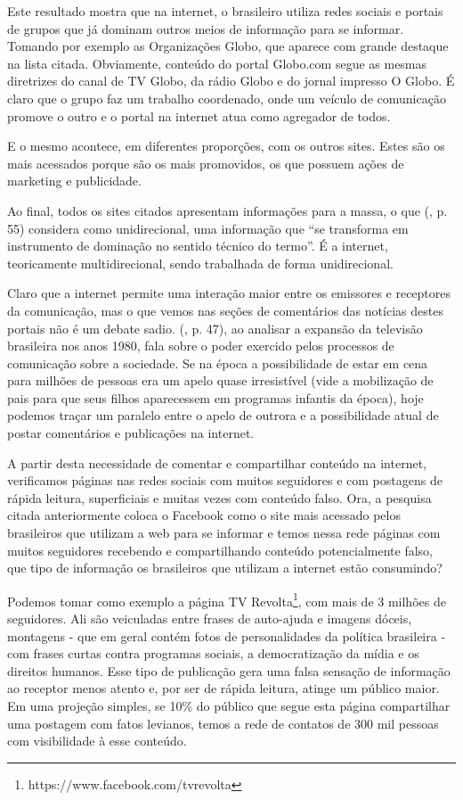 \documentclass[
	article,			%
	12pt,				%
	oneside,			%
	a4paper,			%
	english,			%
	brazil,				%
	]{abntex2}
\begin{document}
Este resultado mostra que na internet, o brasileiro utiliza redes sociais e portais de grupos que já dominam outros meios de informação para se informar. Tomando por exemplo as Organizações Globo, que aparece com grande destaque na lista citada. Obviamente, conteúdo do portal Globo.com segue as mesmas diretrizes do canal de TV Globo, da rádio Globo e do jornal impresso O Globo. É claro que o grupo faz um trabalho coordenado, onde um veículo de comunicação promove o outro e o portal na internet atua como agregador de todos.

E o mesmo acontece, em diferentes proporções, com os outros sites. Estes são os mais acessados porque são os mais promovidos, os que possuem ações de marketing e publicidade. 

Ao final, todos os sites citados apresentam informações para a massa, o que  (\citeyear{bolano2000}, p. 55) considera como unidirecional, uma informação que “se transforma em instrumento de dominação no sentido técnico do termo”. É a internet, teoricamente multidirecional, sendo trabalhada de forma unidirecional.

Claro que a internet permite uma interação maior entre os emissores e receptores da comunicação, mas o que vemos nas seções de comentários das notícias destes portais não é um debate sadio.  (\citeyear{ribeiro1991}, p. 47), ao analisar a expansão da televisão brasileira nos anos 1980, fala sobre o poder exercido pelos processos de comunicação sobre a sociedade. Se na época a possibilidade de estar em cena para milhões de pessoas era um apelo quase irresistível (vide a mobilização de pais para que seus filhos aparecessem em programas infantis da época), hoje podemos traçar um paralelo entre o apelo de outrora e a possibilidade atual de postar comentários e publicações na internet.

A partir desta necessidade de comentar e compartilhar conteúdo na internet, verificamos páginas nas redes sociais com muitos seguidores e com postagens de rápida leitura, superficiais e muitas vezes com conteúdo falso. Ora, a pesquisa citada anteriormente coloca o Facebook como o site mais acessado pelos brasileiros que utilizam a web para se informar e temos nessa rede páginas com muitos seguidores recebendo e compartilhando conteúdo potencialmente falso, que tipo de informação os brasileiros que utilizam a internet estão consumindo?

Podemos tomar como exemplo a página TV Revolta\footnote{https://www.facebook.com/tvrevolta}, com mais de 3 milhões de seguidores. Ali são veiculadas entre frases de auto-ajuda e imagens dóceis, montagens - que em geral contém fotos de personalidades da política brasileira - com frases curtas contra programas sociais, a democratização da mídia e os direitos humanos. Esse tipo de publicação gera uma falsa sensação de informação ao receptor menos atento e, por ser de rápida leitura, atinge um público maior. Em uma projeção simples, se 10\% do público que segue esta página compartilhar uma postagem com fatos levianos, temos a rede de contatos de 300 mil pessoas com visibilidade à esse conteúdo.
\end{document}

